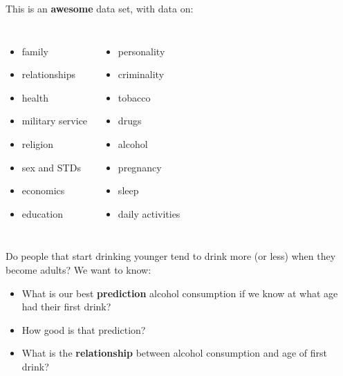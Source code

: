 \documentclass{beamer}\usepackage[]{graphicx}\usepackage[]{color}
\begin{document}
\begin{darkframes}
    \begin{frame}
      This is an \textbf{awesome} data set, with data on:
      \begin{columns}[onlytextwidth]
          \begin{itemize}
            \item family
            \item relationships
            \item health
            \item military service
            \item religion
            \item sex and STDs
            \item economics
            \item education
          \end{itemize}
          \begin{itemize}
            \item personality
            \item criminality
            \item tobacco
            \item drugs
            \item alcohol
            \item pregnancy
            \item sleep
            \item daily activities
          \end{itemize}
      \end{columns}
    \end{frame}

    \begin{frame}
      \begin{center}
        Do people that start drinking younger tend to drink more (or less) when they become adults?
        \pause
        We want to know: 
        \begin{itemize}[<+->]
          \item What is our best \textbf{prediction} alcohol consumption if we know at what age had their first drink?
          \item How good is that prediction?
          \item What is the \textbf{relationship} between alcohol consumption and age of first drink?
        \end{itemize}
      \end{center}
    \end{frame}


\end{darkframes}
\end{document}
